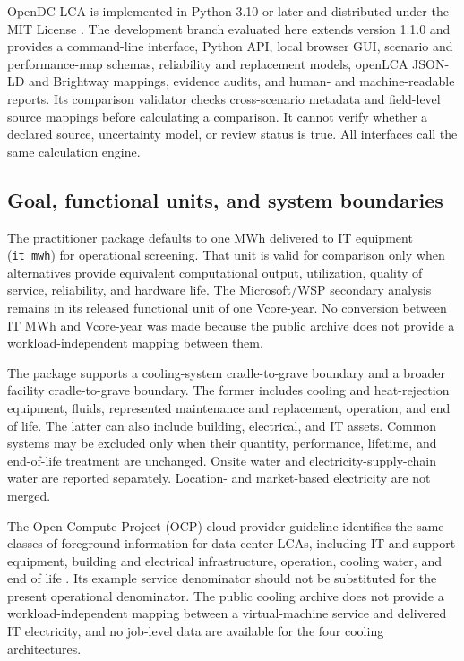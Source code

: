 \documentclass[review,12pt]{elsarticle}
\begin{document}
OpenDC-LCA is implemented in Python 3.10 or later and distributed under the MIT License \cite{ref39}. The development branch evaluated here extends version 1.1.0 and provides a command-line interface, Python API, local browser GUI, scenario and performance-map schemas, reliability and replacement models, openLCA JSON-LD and Brightway mappings, evidence audits, and human- and machine-readable reports. Its comparison validator checks cross-scenario metadata and field-level source mappings before calculating a comparison. It cannot verify whether a declared source, uncertainty model, or review status is true. All interfaces call the same calculation engine.

\subsection{Goal, functional units, and system boundaries}
The practitioner package defaults to one MWh delivered to IT equipment (\texttt{it\_mwh}) for operational screening. That unit is valid for comparison only when alternatives provide equivalent computational output, utilization, quality of service, reliability, and hardware life. The Microsoft/WSP secondary analysis remains in its released functional unit of one Vcore-year. No conversion between IT MWh and Vcore-year was made because the public archive does not provide a workload-independent mapping between them.

The package supports a cooling-system cradle-to-grave boundary and a broader facility cradle-to-grave boundary. The former includes cooling and heat-rejection equipment, fluids, represented maintenance and replacement, operation, and end of life. The latter can also include building, electrical, and IT assets. Common systems may be excluded only when their quantity, performance, lifetime, and end-of-life treatment are unchanged. Onsite water and electricity-supply-chain water are reported separately. Location- and market-based electricity are not merged.

The Open Compute Project (OCP) cloud-provider guideline identifies the same classes of foreground information for data-center LCAs, including IT and support equipment, building and electrical infrastructure, operation, cooling water, and end of life \cite{ref50,ref51,ref52}. Its example service denominator should not be substituted for the present operational denominator. The public cooling archive does not provide a workload-independent mapping between a virtual-machine service and delivered IT electricity, and no job-level data are available for the four cooling architectures.
\end{document}
